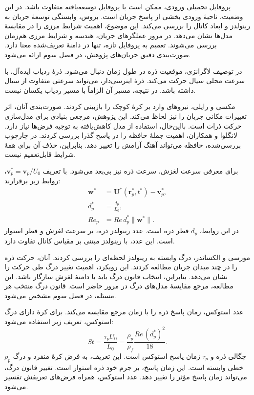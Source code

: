 پروفایل تحمیلی ورودی، ممکن است با پروفایل توسعه‌یافته متفاوت باشد.
در این وضعیت، ناحیهٔ ورودی بخشی از پاسخ جریان است.
بروس، وابستگی توسعهٔ جریان به رینولدز و ابعاد کانال را بررسی می‌کند.
این موضوع، اهمیت شرایط مرزی را در مقایسهٔ مدل‌ها نشان می‌دهد.
\cite{Bruus2014Governing}
در مرور عملگرهای جریان، هندسه و شرایط مرزی هم‌زمان بررسی می‌شوند.
تعمیم به پروفایل تازه، تنها در دامنهٔ تعریف‌شده معنا دارد.
صورت‌بندی دقیق جریان‌های پژوهش، در فصل سوم ارائه می‌شود.

\label{sec:lit-lagrangian-particle}

در توصیف لاگرانژی، موقعیت ذره در طول زمان دنبال می‌شود.
ذرهٔ ردیاب ایده‌آل، با سرعت محلی سیال حرکت می‌کند.
ذرهٔ اینرسی‌دار، می‌تواند سرعتی متفاوت از سیال داشته باشد.
در نتیجه، مسیر آن الزاماً با مسیر ردیاب یکسان نیست.
\cite{ProvencherLanglois2015}

مکسی و رایلی، نیروهای وارد بر کرهٔ کوچک را بازبینی کردند.
صورت‌بندی آنان، اثر تغییرات مکانی جریان را نیز لحاظ می‌کند.
این پژوهش، مرجعی بنیادی برای مدل‌سازی حرکت ذرات است.
\cite{MaxeyRiley1983}
بااین‌حال، استفاده از مدل کاهش‌یافته به توجیه فرض‌ها نیاز دارد.
لانگلوا و همکاران، اهمیت جملهٔ حافظه را در پاسخ گذرا بررسی کردند.
در چارچوب بررسی‌شده، حافظه می‌تواند آهنگ آرامش را تغییر دهد.
بنابراین، حذف آن برای همهٔ شرایط قابل‌تعمیم نیست.
\cite{ProvencherLanglois2015}

برای معرفی سرعت لغزش، سرعت ذره نیز بی‌بعد می‌شود.
با تعریف $\mathbf v_p^*=\mathbf v_p/U_0$، روابط زیر برقرارند:
\begin{equation}
\begin{aligned}
\mathbf w^*&=\mathbf U^*(\mathbf r_p^*,t^*)-\mathbf v_p^*,\\
d_p^*&=\frac{d_p}{L_0},\\
Re_p&=Re\,d_p^*\|\mathbf w^*\|.
\end{aligned}
\label{eq:lit-slip-particle-reynolds}
\end{equation}
در این روابط، $d_p$ قطر ذره است.
عدد رینولدز ذره، بر سرعت لغزش و قطر استوار است.
این عدد، با رینولدز مبتنی بر مقیاس کانال تفاوت دارد.
\cite{MorsiAlexander1972}

مورسی و الکساندر، درگ وابسته به رینولدز لحظه‌ای را بررسی کردند.
آنان، حرکت ذره را در چند میدان جریان مطالعه کردند.
این رویکرد، اهمیت تغییر درگ طی حرکت را نشان می‌دهد.
بنابراین، انتخاب قانون درگ باید با دامنهٔ لغزش سازگار باشد.
\cite{MorsiAlexander1972}
این مطالعه، مرجع مقایسهٔ مدل‌های درگ در مرور حاضر است.
قانون درگ منتخب هر مسئله، در فصل سوم مشخص می‌شود.

عدد استوکس، زمان پاسخ ذره را با زمان مرجع مقایسه می‌کند.
برای کرهٔ دارای درگ استوکس، تعریف زیر استفاده می‌شود:
\begin{equation}
St=\frac{\tau_p U_0}{L_0}
=\frac{\rho_p}{\rho_f}\frac{Re\,(d_p^*)^2}{18}.
\label{eq:lit-stokes-number}
\end{equation}
$\rho_p$ چگالی ذره و $\tau_p$ زمان پاسخ استوکس است.
این تعریف، به فرض کرهٔ منفرد و درگ خطی وابسته است.
این زمان پاسخ، بر جرم خود ذره استوار است.
\cite{ProvencherLanglois2015,Furlani2006Transport}
تغییر قانون درگ، می‌تواند زمان پاسخ مؤثر را تغییر دهد.
عدد استوکس، همراه فرض‌های تعریفش تفسیر می‌شود.

